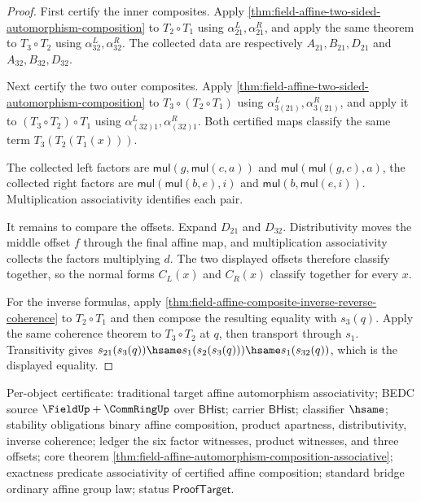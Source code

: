 \begin{proof}
First certify the inner composites. Apply
\autoref{thm:field-affine-two-sided-automorphism-composition} to $T_2\circ T_1$
using $\alpha_{21}^L,\alpha_{21}^R$, and apply the same theorem to
$T_3\circ T_2$ using $\alpha_{32}^L,\alpha_{32}^R$. The collected data are
respectively $A_{21},B_{21},D_{21}$ and $A_{32},B_{32},D_{32}$.

Next certify the two outer composites. Apply
\autoref{thm:field-affine-two-sided-automorphism-composition} to
$T_3\circ(T_2\circ T_1)$ using $\alpha_{3(21)}^L,\alpha_{3(21)}^R$, and apply it
to $(T_3\circ T_2)\circ T_1$ using $\alpha_{(32)1}^L,\alpha_{(32)1}^R$.
Both certified maps classify the same term $T_3(T_2(T_1(x)))$.

The collected left factors are
$\mathsf{mul}(g,\mathsf{mul}(c,a))$ and
$\mathsf{mul}(\mathsf{mul}(g,c),a)$, the collected right factors are
$\mathsf{mul}(\mathsf{mul}(b,e),i)$ and
$\mathsf{mul}(b,\mathsf{mul}(e,i))$. Multiplication associativity identifies
each pair.

It remains to compare the offsets. Expand $D_{21}$ and $D_{32}$. Distributivity
moves the middle offset $f$ through the final affine map, and multiplication
associativity collects the factors multiplying $d$. The two displayed offsets
therefore classify together, so the normal forms $C_L(x)$ and $C_R(x)$ classify
together for every $x$.

For the inverse formulas, apply
\autoref{thm:field-affine-composite-inverse-reverse-coherence} to
$T_2\circ T_1$ and then compose the resulting equality with $s_3(q)$. Apply the
same coherence theorem to $T_3\circ T_2$ at $q$, then transport through $s_1$.
Transitivity gives
$s_{21}(s_3(q))\hsame s_1(s_2(s_3(q)))\hsame s_1(s_{32}(q))$, which is the
displayed equality.
\end{proof}

Per-object certificate: traditional target affine automorphism associativity;
BEDC source $\FieldUp+\CommRingUp$ over $\mathsf{BHist}$; carrier
$\mathsf{BHist}$; classifier $\hsame$; stability obligations binary affine
composition, product apartness, distributivity, inverse coherence; ledger the
six factor witnesses, product witnesses, and three offsets; core theorem
\autoref{thm:field-affine-automorphism-composition-associative}; exactness
predicate associativity of certified affine composition; standard bridge
ordinary affine group law; status $\mathsf{ProofTarget}$.

